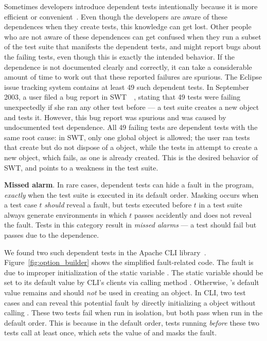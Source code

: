 Sometimes developers introduce dependent tests intentionally because it is
more efficient or convenient~\cite{kapfhammeretal:FSE:2003, whittakeretal:2012}.
Even though the developers are aware of these dependences
when they create tests, this knowledge can get lost.
Other people who are not aware of these dependences can get confused 
when they run a subset of the test suite that manifests the
dependent tests, and might report bugs about the failing tests,
even though this is exactly the intended behavior. 
If the dependence is not documented clearly and
correctly, it can take a considerable amount of time to work out that
these reported failures are spurious. 
The Eclipse issue tracking system contains at least
49 such dependent tests.
In September 2003, a user filed a
bug report in SWT~\cite{swt}~\cite{eclipsebug},
stating that 49 tests were failing unexpectedly
if she ran any other test before  --- 
a test suite creates a new  object and tests it.
However, this bug report was spurious and was
caused by undocumented test dependence.
All 49 failing tests are dependent tests with the same
root cause: in SWT, only one global 
object is allowed; the user ran tests that
create but do not dispose of a  object, while
the tests in  attempt to create
a new  object, which fails, as one
is already created. This is the desired behavior of SWT,
and points to a weakness in the test suite.

\vspace{1mm}

\noindent \textbf{Missed alarm}. In rare cases,
dependent tests can hide a fault in the
program, \emph{exactly} when the test suite is executed in its default
order. Masking occurs when a test case $t$ \emph{should}
reveal a fault, but tests executed before $t$ in a test suite always
generate environments in which $t$ passes accidently and
does not reveal the fault. 
Tests in this category result in \textit{missed alarms} ---
a test should fail but passes due to the dependence.



We found two such dependent tests in
the Apache CLI library~\cite{cli}.
Figure~\ref{fig:option_builder} shows the simplified fault-related
code. The fault is due to improper initialization of the static variable
. The static variable  should be set
to its default value  by CLI's clients via calling
method . Otherwise, 's
default value remains  and should \emph{not} be
used in creating an  object.
In CLI, two test cases 
 and 
can reveal this potential fault by directly initializing
a  object without calling .
These two tests fail when run in isolation,
but both pass when run in the default order. This is because
in the default order, tests running \emph{before} these
two tests call  at least once, which sets
the value of  and masks the fault.

